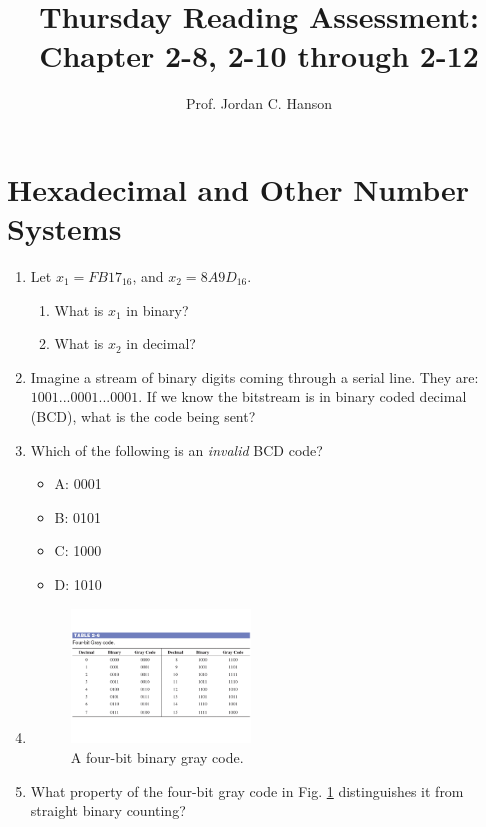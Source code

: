 \documentclass{article}
\begin{document}
\title{Thursday Reading Assessment: Chapter 2-8, 2-10 through 2-12}
\author{Prof. Jordan C. Hanson}

\maketitle

\section{Hexadecimal and Other Number Systems}

\begin{enumerate}
\item Let $x_1 = FB17_{16}$, and $x_2 = 8A9D_{16}$.
\begin{enumerate}
\item What is $x_1$ in binary? \\ \vspace{1cm}
\item What is $x_2$ in decimal? \\ \vspace{1cm}
\end{enumerate}
\item Imagine a stream of binary digits coming through a serial line.  They are: $1001 ... 0001 ... 0001$.  If we know the bitstream is in binary coded decimal (BCD), what is the code being sent? \\ \vspace{1cm}
\item Which of the following is an \textit{invalid} BCD code?
\begin{itemize}
\item A: 0001
\item B: 0101
\item C: 1000
\item D: 1010
\end{itemize}
\item
\begin{figure}[hb]
\centering
\includegraphics[width=0.45\textwidth]{gray.pdf}
\caption{\label{fig:gray} A four-bit binary gray code.}
\end{figure}
\item What property of the four-bit gray code in Fig. \ref{fig:gray} distinguishes it from straight binary counting?
\end{enumerate}
\end{document}
